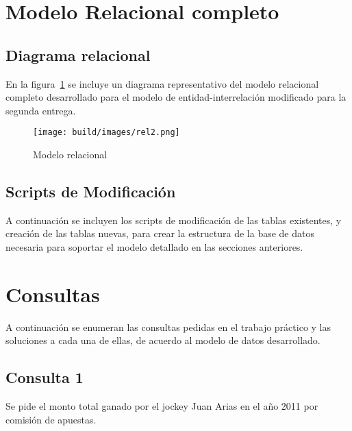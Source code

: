 \documentclass[a4paper,11pt]{article}
\begin{document}
\section{Modelo Relacional completo}

\subsection{Diagrama relacional}

En la figura~\ref{fig:rel2} se incluye un diagrama representativo del
modelo relacional completo desarrollado para el modelo de entidad-interrelación
modificado para la segunda entrega.

\begin{figure}[h!t]
  \centering
  \texttt{[image: build/images/rel2.png]}
  \caption{Modelo relacional} \label{fig:rel2}
\end{figure}

\FloatBarrier

\subsection{Scripts de Modificación}

A continuación se incluyen los scripts de modificación de las tablas
existentes, y creación de las tablas nuevas, para crear la estructura de la
base de datos necesaria para soportar el modelo detallado en las secciones
anteriores.



\clearpage

\section{Consultas}

A continuación se enumeran las consultas pedidas en el trabajo práctico y las
soluciones a cada una de ellas, de acuerdo al modelo de datos desarrollado.

\subsection{Consulta 1}

Se pide el monto total ganado por el jockey Juan Arias en el año 2011 por
comisión de apuestas.
\end{document}
